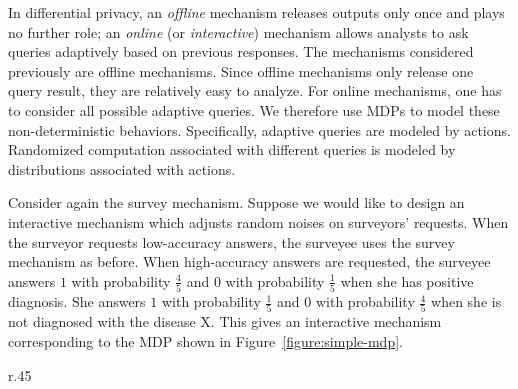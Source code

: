 In differential privacy, an \emph{offline} mechanism releases outputs only
once and plays no further role; an \emph{online} (or \emph{interactive}) mechanism
allows analysts to ask queries adaptively based on previous
responses. The mechanisms considered previously are offline
mechanisms. 
Since offline mechanisms only release one query result, they are
relatively easy to analyze. For online mechanisms, one has to consider
all possible adaptive queries. We therefore use MDPs to model these
non-deterministic behaviors.
Specifically, adaptive queries are modeled by
actions. Randomized computation associated with different queries is
modeled by distributions associated with actions.


Consider again the survey mechanism. Suppose we would like to design
an interactive mechanism which adjusts random noises on surveyors'
requests. When the surveyor requests low-accuracy answers, the
surveyee uses the survey mechanism as before. When high-accuracy
answers are requested, the surveyee answers $1$ with
probability $\frac{4}{5}$ and $0$ with probability $\frac{1}{5}$ when she has
positive diagnosis. She answers $1$ with probability $\frac{1}{5}$
and $0$ with probability $\frac{4}{5}$ when she is not
diagnosed with the disease X. This gives an interactive mechanism
corresponding to the MDP shown in
Figure~\ref{figure:simple-mdp}.

\begin{wrapfigure}[14]{r}{.45\columnwidth}
  \centering
    \caption{Markov Decision Process}
    \label{figure:simple-mdp}
\end{wrapfigure}

